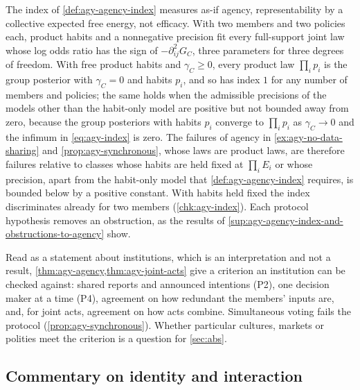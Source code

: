 The index of \cref{def:agy-agency-index} measures as-if agency, representability by a collective expected free energy, not efficacy. With two members and two policies each, product habits and a nonnegative precision fit every full-support joint law whose log odds ratio has the sign of $-\partial^2_{ij}G_C$, three parameters for three degrees of freedom. With free product habits and $\gamma_C\ge0$, every product law $\prod_ip_i$ is the group posterior with $\gamma_C=0$ and habits $p_i$, and so has index $1$ for any number of members and policies; the same holds when the admissible precisions of the models other than the habit-only model are positive but not bounded away from zero, because the group posteriors with habits $p_i$ converge to $\prod_ip_i$ as $\gamma_C\to0$ and the infimum in \eqref{eq:agy-index} is zero. The failures of agency in \cref{ex:agy-no-data-sharing} and \cref{prop:agy-synchronous}, whose laws are product laws, are therefore failures relative to classes whose habits are held fixed at $\prod_iE_i$ or whose precision, apart from the habit-only model that \cref{def:agy-agency-index} requires, is bounded below by a positive constant. With habits held fixed the index discriminates already for two members (\cref{chk:agy-index}). Each protocol hypothesis removes an obstruction, as the results of \cref{sup:agy-agency-index-and-obstructions-to-agency} show.

Read as a statement about institutions, which is an interpretation and not a result, \cref{thm:agy-agency,thm:agy-joint-acts} give a criterion an institution can be checked against: shared reports and announced intentions (P2), one decision maker at a time (P4), agreement on how redundant the members' inputs are, and, for joint acts, agreement on how acts combine. Simultaneous voting fails the protocol (\cref{prop:agy-synchronous}). Whether particular cultures, markets or polities meet the criterion is a question for \cref{sec:abs}.

\subsection{Commentary on identity and interaction}\label{sup:agy-commentary-on-identity-and-interaction}

